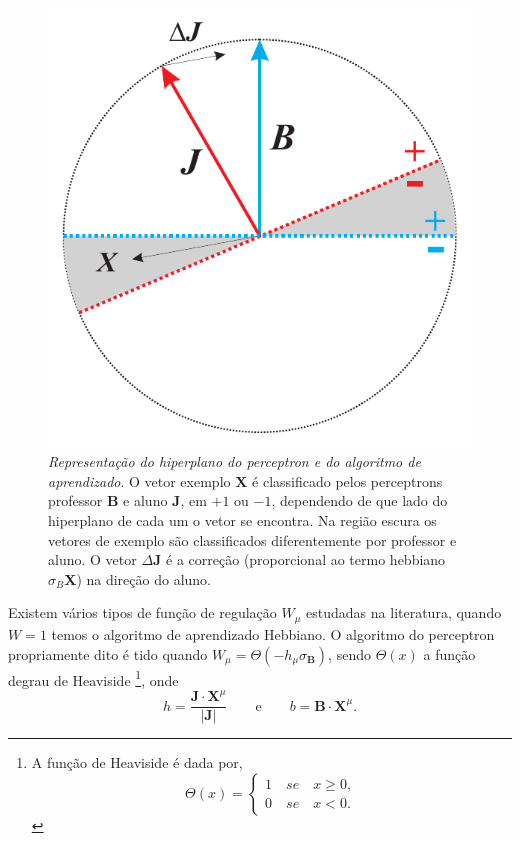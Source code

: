 \begin{figure}
    \centering
    \includegraphics[scale = 0.6]{Figures/bolinhagay}
    \caption{\textit{Representação do hiperplano do perceptron e do
    algoritmo de aprendizado}. O vetor exemplo $\mathbf{X}$ é classificado
    pelos perceptrons professor $\mathbf{B}$ e aluno $\mathbf{J}$, em $+1$
    ou $-1$, dependendo de que lado do hiperplano de cada um o vetor se
    encontra. Na região escura os vetores de exemplo são classificados
    diferentemente por professor e aluno. O vetor $\Delta \mathbf{J}$ é
    a correção (proporcional ao termo hebbiano $\sigma_B\mathbf{X}$) na
    direção do aluno.}
\end{figure}

Existem vários tipos de função de regulação $ W_\mu$ estudadas na
literatura, quando $ W=1 $ temos o algoritmo de aprendizado Hebbiano. O
algoritmo do perceptron propriamente dito é tido quando $W_\mu = \Theta\left(
- h_\mu \sigma_\mathbf{B}\right)$, sendo $\Theta\left(x\right)$ a função
degrau de Heaviside 
\footnote{ A função de Heaviside é dada por,
\begin{equation}
  \Theta\left(x\right)=\left\{
  \begin{array}{c}
    1 \quad se \quad x\geq 0,  \\
    0 \quad se \quad x<0. 
  \end{array} 
  \right.
\end{equation} 
}, onde 
\begin{equation}
  h = \frac{\mathbf{J}\cdot\mathbf{X}^\mu}{ \left|\mathbf{J}\right|} \qquad
  \text{e}  \qquad b = \mathbf{B}\cdot\mathbf{X}^\mu.
\end{equation}


